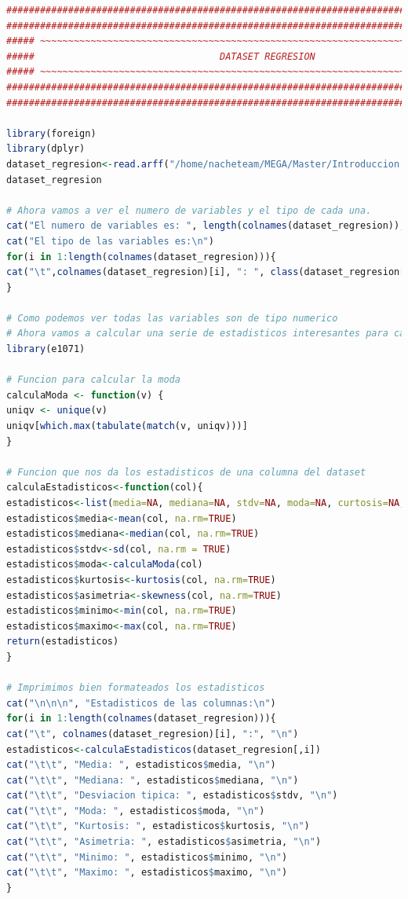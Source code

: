 \documentclass[12pt,a4paper]{article}
\begin{document}
\begin{lstlisting}[basicstyle=\tiny, language=R]
###############################################################################################
###############################################################################################
##### ~~~~~~~~~~~~~~~~~~~~~~~~~~~~~~~~~~~~~~~~~~~~~~~~~~~~~~~~~~~~~~~~~~~~~~~~~~~~~~~~~~  #####
#####                                 DATASET REGRESION                                   #####
##### ~~~~~~~~~~~~~~~~~~~~~~~~~~~~~~~~~~~~~~~~~~~~~~~~~~~~~~~~~~~~~~~~~~~~~~~~~~~~~~~~~~  #####
###############################################################################################
###############################################################################################

library(foreign)
library(dplyr)
dataset_regresion<-read.arff("/home/nacheteam/MEGA/Master/Introduccion a la ciencia de datos/Trabajo Integrador/DATOS/Datasets Regresion/treasury/treasury.dat")
dataset_regresion

# Ahora vamos a ver el numero de variables y el tipo de cada una.
cat("El numero de variables es: ", length(colnames(dataset_regresion)), "\n")
cat("El tipo de las variables es:\n")
for(i in 1:length(colnames(dataset_regresion))){
cat("\t",colnames(dataset_regresion)[i], ": ", class(dataset_regresion[i][[1]]), "\n")
}

# Como podemos ver todas las variables son de tipo numerico
# Ahora vamos a calcular una serie de estadisticos interesantes para cada variable.
library(e1071)

# Funcion para calcular la moda
calculaModa <- function(v) {
uniqv <- unique(v)
uniqv[which.max(tabulate(match(v, uniqv)))]
}

# Funcion que nos da los estadisticos de una columna del dataset
calculaEstadisticos<-function(col){
estadisticos<-list(media=NA, mediana=NA, stdv=NA, moda=NA, curtosis=NA, asimetria=NA, minimo=NA, maximo=NA)
estadisticos$media<-mean(col, na.rm=TRUE)
estadisticos$mediana<-median(col, na.rm=TRUE)
estadisticos$stdv<-sd(col, na.rm = TRUE)
estadisticos$moda<-calculaModa(col)
estadisticos$kurtosis<-kurtosis(col, na.rm=TRUE)
estadisticos$asimetria<-skewness(col, na.rm=TRUE)
estadisticos$minimo<-min(col, na.rm=TRUE)
estadisticos$maximo<-max(col, na.rm=TRUE)
return(estadisticos)
}

# Imprimimos bien formateados los estadisticos
cat("\n\n\n", "Estadisticos de las columnas:\n")
for(i in 1:length(colnames(dataset_regresion))){
cat("\t", colnames(dataset_regresion)[i], ":", "\n")
estadisticos<-calculaEstadisticos(dataset_regresion[,i])
cat("\t\t", "Media: ", estadisticos$media, "\n")
cat("\t\t", "Mediana: ", estadisticos$mediana, "\n")
cat("\t\t", "Desviacion tipica: ", estadisticos$stdv, "\n")
cat("\t\t", "Moda: ", estadisticos$moda, "\n")
cat("\t\t", "Kurtosis: ", estadisticos$kurtosis, "\n")
cat("\t\t", "Asimetria: ", estadisticos$asimetria, "\n")
cat("\t\t", "Minimo: ", estadisticos$minimo, "\n")
cat("\t\t", "Maximo: ", estadisticos$maximo, "\n")
}


\end{lstlisting}
\end{document}
